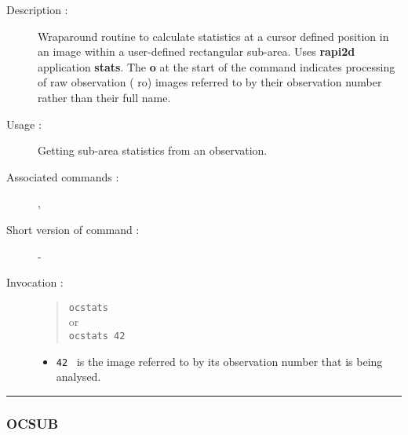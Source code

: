 \begin{description}

\item[Description :] Wraparound routine to calculate statistics at a
cursor defined position in an image within a user-defined rectangular
sub-area.  Uses {\bf rapi2d} application {\bf stats}. The {\bf o} at
the start of the command indicates processing of raw observation ({\sc
ro}) images referred to by their observation number rather than their
full name.

\item[Usage :] Getting sub-area statistics from an observation.
\item[Associated commands :] {\tt {}}, 
{\tt {}}
\item[Short version of command :] -
\item[Invocation :]

\begin{quote}{\tt  ocstats }\\
or \\
{\tt ocstats 42 }
\end{quote}

\begin{itemize}

\item {\tt 42 } is the image referred to by its observation number that
 is being analysed.
\end{itemize}

\end{description}

\hrule 
\subsubsection*{\label{OCSUB}OCSUB}

